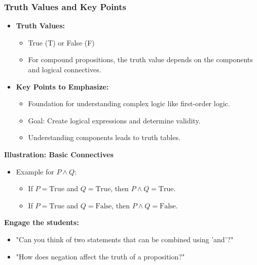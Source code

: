 \documentclass[aspectratio=169]{beamer}
\begin{document}
\begin{frame}[fragile]
    \frametitle{Truth Values and Key Points}
    
    \begin{itemize}
        \item \textbf{Truth Values:}
            \begin{itemize}
                \item True (T) or False (F)
                \item For compound propositions, the truth value depends on the components and logical connectives.
            \end{itemize}
        
        \item \textbf{Key Points to Emphasize:}
            \begin{itemize}
                \item Foundation for understanding complex logic like first-order logic.
                \item Goal: Create logical expressions and determine validity.
                \item Understanding components leads to truth tables.
            \end{itemize}
    \end{itemize}
    
    \textbf{Illustration: Basic Connectives}
    \begin{itemize}
        \item Example for \( P \land Q \):
            \begin{itemize}
                \item If \( P = \text{True} \) and \( Q = \text{True} \), then \( P \land Q = \text{True} \).
                \item If \( P = \text{True} \) and \( Q = \text{False} \), then \( P \land Q = \text{False} \).
            \end{itemize}
    \end{itemize}
    
    \textbf{Engage the students:} 
    \begin{itemize}
        \item "Can you think of two statements that can be combined using 'and'?"
        \item "How does negation affect the truth of a proposition?"
    \end{itemize}
\end{frame}
\end{document}
